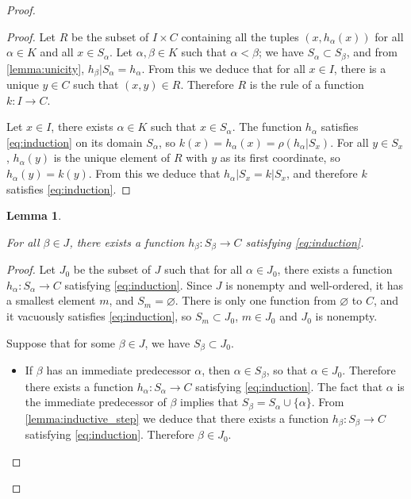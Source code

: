\documentclass[11pt,a4paper,twoside]{article}
\theoremstyle{definition}
\theoremstyle{plain}
\newtheorem{lemma}{Lemma}
\begin{document}
\begin{proof}
\begin{proof}
  Let $R$ be the subset of $I \times C$ containing all the tuples $( x, h_\alpha ( x ) )$ for all $\alpha \in K$ and all $x \in S_\alpha$.
  Let $\alpha, \beta \in K$ such that $\alpha < \beta$; we have $S_\alpha \subset S_\beta$, and from \cref{lemma:unicity},
  $h_\beta | S_\alpha = h_\alpha$. From this we deduce that for all $x \in I$, there is a unique $y \in C$ such that $( x, y ) \in R$.
  Therefore $R$ is the rule of a function $k : I \to C$.

  Let $x \in I$, there exists $\alpha \in K$ such that $x \in S_\alpha$. The function $h_\alpha$ satisfies \eqref{eq:induction} on its domain $S_\alpha$,
  so $k ( x ) = h_\alpha ( x ) = \rho ( h_\alpha | S_x )$. For all $y \in S_x$, $h_\alpha ( y )$ is the unique element of $R$ with $y$ as its
  first coordinate, so $h_\alpha ( y ) = k ( y )$. From this we deduce that $h_\alpha | S_x = k | S_x$, and therefore $k$ satisfies \eqref{eq:induction}.

\end{proof}

\begin{lemma} \label{lemma:transfinite_induction}

  For all $\beta \in J$, there exists a function $h_\beta : S_\beta \to C$ satisfying \eqref{eq:induction}.

\end{lemma}

\begin{proof}

  Let $J_0$ be the subset of $J$ such that for all $\alpha \in J_0$, there exists a function $h_\alpha : S_\alpha \to C$ satisfying \eqref{eq:induction}.
  Since $J$ is nonempty and well-ordered, it has a smallest element $m$, and $S_m = \varnothing$.
  There is only one function from $\varnothing$ to $C$, and it vacuously satisfies \eqref{eq:induction},
  so $S_m \subset J_0$, $m \in J_0$ and $J_0$ is nonempty.

  Suppose that for some $\beta \in J$, we have $S_\beta \subset J_0$.
  \begin{itemize}

  \item If $\beta$ has an immediate predecessor $\alpha$, then $\alpha \in S_\beta$, so that $\alpha \in J_0$.
    Therefore there exists a function $h_\alpha : S_\alpha \to C$ satisfying \eqref{eq:induction}. The fact that
    $\alpha$ is the immediate predecessor of $\beta$ implies that $S_\beta = S_\alpha \cup \{ \alpha \}$.
    From \cref{lemma:inductive_step} we deduce that there exists a function $h_\beta : S_\beta \to C$ satisfying \eqref{eq:induction}.
    Therefore $\beta \in J_0$.


\end{itemize}
\end{proof}
\end{proof}
\end{document}
